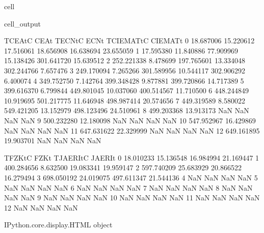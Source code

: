 \documentclass[letterpaper,10pt,english]{jupyterBook}
\begin{document}
\begin{sphinxuseclass}{cell}
\begin{sphinxVerbatimOutput}
			\begin{sphinxuseclass}{cell_output}
				\begin{sphinxVerbatim}[commandchars=\\\{\}]
					T\PYGZus{}CEA\PYGZus{}tC      CEA\PYGZus{}t    T\PYGZus{}ECN\PYGZus{}tC      ECN\PYGZus{}t  T\PYGZus{}CIEMAT\PYGZus{}tC   CIEMAT\PYGZus{}t  \PYGZbs{}
					0    18.687006  15.220612   17.516061  18.656908    16.638694  23.655059   
					1    17.595380  11.840886   77.909969  15.138426   301.641720  15.639512   
					2   252.221338   8.478699  197.765601  13.334048   302.244766   7.657476   
					3   249.170094   7.265266  301.589956  10.544117   302.906292   6.400074   
					4   349.752750   7.142764  399.348428   9.877881   399.720866  14.717389   
					5   399.616370   6.799844  449.801045  10.037060   400.514567  11.710500   
					6   448.244849  10.919695  501.217775  11.646948   498.987414  20.574656   
					7   449.319589   8.580022  549.421205  13.152979   498.123496  24.510961   
					8   499.203368  13.913173         NaN        NaN          NaN        NaN   
					9   500.232280  12.180098         NaN        NaN          NaN        NaN   
					10  547.952967  16.429869         NaN        NaN          NaN        NaN   
					11  647.631622  22.329999         NaN        NaN          NaN        NaN   
					12  649.161895  19.903701         NaN        NaN          NaN        NaN   
					
					T\PYGZus{}FZK\PYGZus{}tC      FZK\PYGZus{}t  T\PYGZus{}JAERI\PYGZus{}tC    JAERI\PYGZus{}t  
					0    18.010233  15.136548   16.984994  21.169447  
					1   400.284656   8.632500   19.083341  19.959147  
					2   597.740209  25.683929   20.866522  16.279494  
					3   698.050192  24.019075  497.611347  21.544136  
					4          NaN        NaN         NaN        NaN  
					5          NaN        NaN         NaN        NaN  
					6          NaN        NaN         NaN        NaN  
					7          NaN        NaN         NaN        NaN  
					8          NaN        NaN         NaN        NaN  
					9          NaN        NaN         NaN        NaN  
					10         NaN        NaN         NaN        NaN  
					11         NaN        NaN         NaN        NaN  
					12         NaN        NaN         NaN        NaN  
				\end{sphinxVerbatim}
				
				\begin{sphinxVerbatim}[commandchars=\\\{\}]
					\PYGZlt{}IPython.core.display.HTML object\PYGZgt{}
				\end{sphinxVerbatim}
				

\end{sphinxuseclass}
\end{sphinxVerbatimOutput}
\end{sphinxuseclass}
\end{document}

